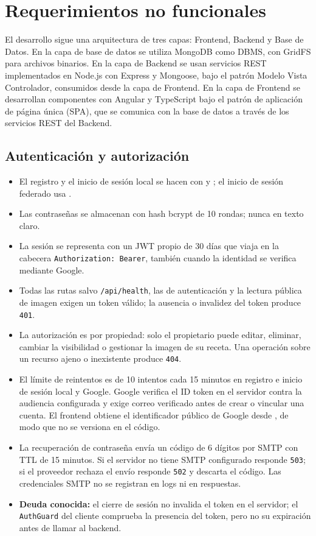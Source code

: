 \chapter{Requerimientos no funcionales}
\label{ch:rnf}

El desarrollo sigue una arquitectura de tres capas: Frontend, Backend y Base de Datos. En la capa de base de datos se utiliza MongoDB como DBMS, con GridFS para archivos binarios. En la capa de Backend se usan servicios REST implementados en Node.js con Express y Mongoose, bajo el patrón Modelo Vista Controlador, consumidos desde la capa de Frontend. En la capa de Frontend se desarrollan componentes con Angular y TypeScript bajo el patrón de aplicación de página única (SPA), que se comunica con la base de datos a través de los servicios REST del Backend.

\section{Autenticación y autorización}

\begin{itemize}[leftmargin=*]
  \item El registro y el inicio de sesión local se hacen con  y ; el inicio de sesión federado usa .
  \item Las contraseñas se almacenan con hash bcrypt de 10 rondas; nunca en texto claro.
  \item La sesión se representa con un JWT propio de 30 días que viaja en la cabecera \texttt{Authorization: Bearer}, también cuando la identidad se verifica mediante Google.
  \item Todas las rutas salvo \texttt{/api/health}, las de autenticación y la lectura pública de imagen exigen un token válido; la ausencia o invalidez del token produce \texttt{401}.
  \item La autorización es por propiedad: solo el propietario puede editar, eliminar, cambiar la visibilidad o gestionar la imagen de su receta. Una operación sobre un recurso ajeno o inexistente produce \texttt{404}.
  \item El límite de reintentos es de 10 intentos cada 15 minutos en registro e inicio de sesión local y Google. Google verifica el ID token en el servidor contra la audiencia configurada y exige correo verificado antes de crear o vincular una cuenta. El frontend obtiene el identificador público de Google desde , de modo que no se versiona en el código.
  \item La recuperación de contraseña envía un código de 6 dígitos por SMTP con TTL de 15 minutos. Si el servidor no tiene SMTP configurado responde \texttt{503}; si el proveedor rechaza el envío responde \texttt{502} y descarta el código. Las credenciales SMTP no se registran en logs ni en respuestas.
  \item \textbf{Deuda conocida:} el cierre de sesión no invalida el token en el servidor; el \texttt{AuthGuard} del cliente comprueba la presencia del token, pero no su expiración antes de llamar al backend.
\end{itemize}

